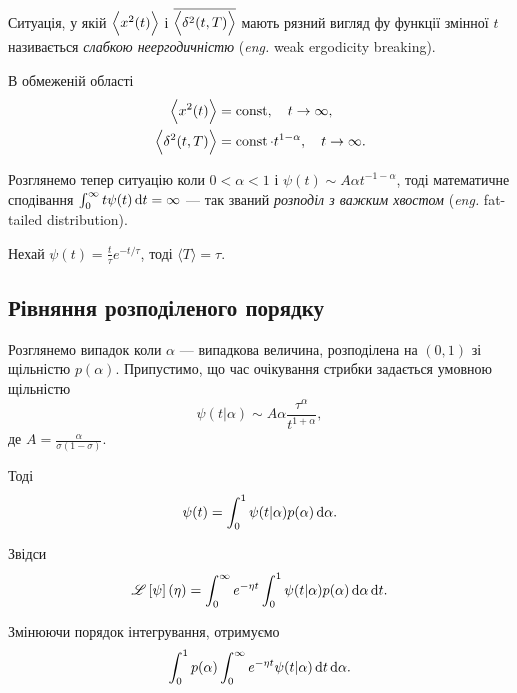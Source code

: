 \begin{definition}
    Ситуація, у якій $\Big\langle x^2(t) \Big\rangle$ і $\overline{\Big\langle \delta^2(t, T) \Big\rangle}$ мають рязний вигляд фу функції змінної $t$ називається \textit{слабкою неергодичністю} (\textit{eng.} weak ergodicity breaking).
\end{definition}

\begin{remark}
    В обмеженій області
    \begin{align}
        \Big\langle x^2(t) \Big\rangle &= \operatorname{const}, \quad t \to \infty, \\
        \Big\langle \delta^2(t, T) \Big\rangle &= \operatorname{const} \cdot t^{1 - \alpha}, \quad t \to \infty.
    \end{align}
\end{remark}

Розглянемо тепер ситуацію коли $0 < \alpha < 1$ і $\psi(t) \sim A \alpha t^{-1 - \alpha}$, тоді математичне сподівання $\int_0^\infty t \psi(t) \mathop{}\!\mathrm{d} t = \infty$ --- так званий \textit{розподіл з важким хвостом} (\textit{eng.} fat-tailed distribution).

\begin{example}
    Нехай $\psi(t) = \frac{t}{\tau} e^{-t / \tau}$, тоді $\langle T \rangle = \tau$.
\end{example}

\subsection{Рівняння розподіленого порядку}

Розглянемо випадок коли $\alpha$ --- випадкова величина, розподілена на $(0, 1)$ зі щільністю $p(\alpha)$. Припустимо, що час очікування стрибки задається умовною щільністю
\begin{equation}
    \psi(t|\alpha) \sim A \alpha \frac{\tau^\alpha}{t^{1 + \alpha}},
\end{equation}
де $A = \frac{\alpha}{\sigma (1 - \sigma)}$. \medskip

Тоді
\begin{equation}
    \psi(t) = \int_0^1 \psi(t|\alpha) p(\alpha) \mathop{}\!\mathrm{d} \alpha.
\end{equation}

Звідси
\begin{equation}
    \mathscr{L}\left[\psi\right](\eta)
    = \int_0^\infty e^{-\eta t} \int_0^1 \psi(t|\alpha) p(\alpha) \mathop{}\!\mathrm{d} \alpha \mathop{}\!\mathrm{d} t.
\end{equation}

Змінюючи порядок інтегрування, отримуємо
\begin{equation}
    \int_0^1 p(\alpha) \int_0^\infty e^{-\eta t} \psi(t|\alpha) \mathop{}\!\mathrm{d} t \mathop{}\!\mathrm{d} \alpha.
\end{equation}

